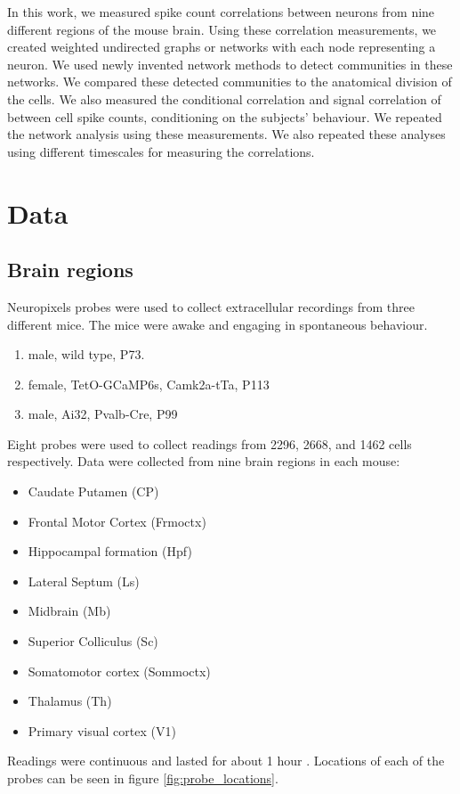 \documentclass[a4paper,12pt]{article}
\theoremstyle{definition}
\begin{document}
    In this work, we measured spike count correlations between neurons from nine different regions of the mouse brain. Using these correlation measurements, we created weighted undirected graphs or networks with each node representing a neuron. We used newly invented network methods to detect communities in these networks. We compared these detected communities to the anatomical division of the cells. We also measured the conditional correlation and signal correlation of between cell spike counts, conditioning on the subjects' behaviour. We repeated the network analysis using these measurements. We also repeated these analyses using different timescales for measuring the correlations. 

\newpage

\section{Data}
    \subsection{Brain regions}
    Neuropixels probes were used to collect extracellular recordings \cite{jun} from three different mice. The mice were awake and engaging in spontaneous behaviour. 
    \begin{enumerate}
        \item male, wild type, P73. %
        \item female, TetO-GCaMP6s, Camk2a-tTa, P113 %
        \item male, Ai32, Pvalb-Cre, P99 %
    \end{enumerate}

    Eight probes were used to collect readings from 2296, 2668, and 1462 cells respectively. Data were collected from nine brain regions in each mouse:
    \begin{itemize}
        \item Caudate Putamen (CP)
        \item Frontal Motor Cortex (Frmoctx)
        \item Hippocampal formation (Hpf)
        \item Lateral Septum (Ls)
        \item Midbrain (Mb)
        \item Superior Colliculus (Sc)
        \item Somatomotor cortex (Sommoctx)
        \item Thalamus (Th)
        \item Primary visual cortex (V1)
    \end{itemize}
    Readings were continuous and lasted for about 1 hour \cite{stringer}. Locations of each of the probes can be seen in figure \ref{fig:probe_locations}.
\end{document}
